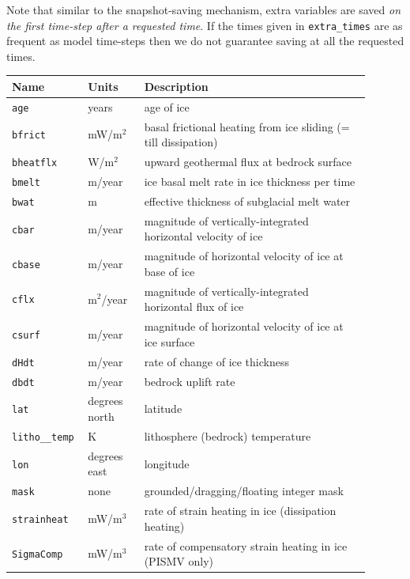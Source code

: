 \documentclass[11pt,final]{amsart}
\newcommand{\und}{\_\!\_}
\begin{document}
Note that similar to the snapshot-saving mechanism, extra variables are saved \emph{on the first time-step after a requested time}.  If the times given in \verb|extra_times| are as frequent as model time-steps then we do not guarantee saving at all the requested times.

\begin{table}[h]
  \caption{Diagnostic quantities}
  \centering
  \begin{longtable}{p{0.15\linewidth}p{0.15\linewidth}p{0.6\linewidth}}\hline
    \textbf{Name} & \textbf{Units} & \textbf{Description}\\
    \hline
    \texttt{age} & years & age of ice \\
    \texttt{bfrict} & mW/m$^{2}$ & basal frictional heating from ice sliding (= till dissipation) \\
    \texttt{bheatflx} & W/m$^{2}$ & upward geothermal flux at bedrock surface \\
    \texttt{bmelt} & m/year & ice basal melt rate in ice thickness per time \\
    \texttt{bwat} & m & effective thickness of subglacial melt water \\
    \texttt{cbar} & m/year & magnitude of vertically-integrated horizontal velocity of ice \\
    \texttt{cbase} & m/year & magnitude of horizontal velocity of ice at base of ice \\
    \texttt{cflx} & m$^{2}$/year & magnitude of vertically-integrated horizontal flux of ice \\
    \texttt{csurf} & m/year & magnitude of horizontal velocity of ice at ice surface \\
    \texttt{dHdt} & m/year & rate of change of ice thickness \\
    \texttt{dbdt} & m/year& bedrock uplift rate \\
    \texttt{lat} & degrees north& latitude \\
    \texttt{litho\und temp} & K & lithosphere (bedrock) temperature\\
    \texttt{lon} & degrees east & longitude \\
    \texttt{mask} & none & grounded/dragging/floating integer mask \\
    \texttt{strainheat} & mW/m$^{3}$ & rate of strain heating in ice (dissipation heating) \\
    \texttt{SigmaComp} & mW/m$^{3}$ & rate of compensatory strain heating in ice (PISMV only)\\

\end{longtable}
\end{table}
\end{document}
